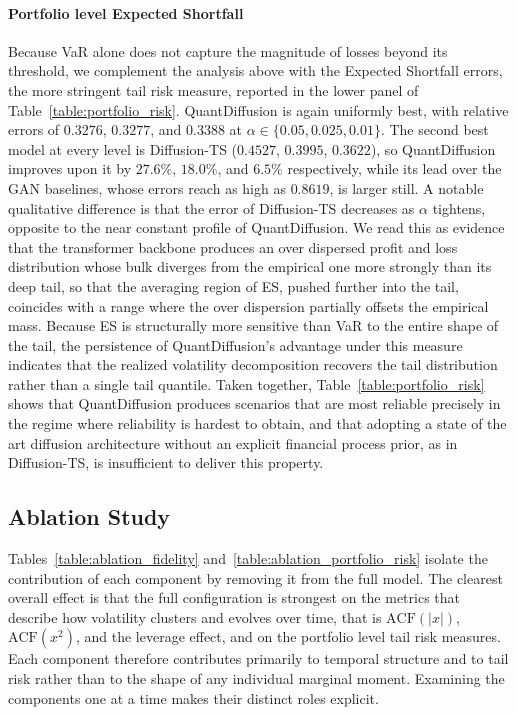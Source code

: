 \documentclass[sigconf,natbib=false]{acmart}
\begin{document}
\paragraph{Portfolio level Expected Shortfall}

Because VaR alone does not capture the magnitude of losses beyond its threshold, we complement the analysis above with the Expected Shortfall errors, the more stringent tail risk measure, reported in the lower panel of Table~\ref{table:portfolio_risk}. QuantDiffusion is again uniformly best, with relative errors of $0.3276$, $0.3277$, and $0.3388$ at $\alpha \in \{0.05, 0.025, 0.01\}$. The second best model at every level is Diffusion-TS ($0.4527$, $0.3995$, $0.3622$), so QuantDiffusion improves upon it by $27.6\%$, $18.0\%$, and $6.5\%$ respectively, while its lead over the GAN baselines, whose errors reach as high as $0.8619$, is larger still. A notable qualitative difference is that the error of Diffusion-TS decreases as $\alpha$ tightens, opposite to the near constant profile of QuantDiffusion. We read this as evidence that the transformer backbone produces an over dispersed profit and loss distribution whose bulk diverges from the empirical one more strongly than its deep tail, so that the averaging region of ES, pushed further into the tail, coincides with a range where the over dispersion partially offsets the empirical mass. Because ES is structurally more sensitive than VaR to the entire shape of the tail, the persistence of QuantDiffusion's advantage under this measure indicates that the realized volatility decomposition recovers the tail distribution rather than a single tail quantile. Taken together, Table~\ref{table:portfolio_risk} shows that QuantDiffusion produces scenarios that are most reliable precisely in the regime where reliability is hardest to obtain, and that adopting a state of the art diffusion architecture without an explicit financial process prior, as in Diffusion-TS, is insufficient to deliver this property.

\subsection{Ablation Study}

Tables~\ref{table:ablation_fidelity} and~\ref{table:ablation_portfolio_risk} isolate the contribution of each component by removing it from the full model. The clearest overall effect is that the full configuration is strongest on the metrics that describe how volatility clusters and evolves over time, that is $\mathrm{ACF}(|x|)$, $\mathrm{ACF}(x^{2})$, and the leverage effect, and on the portfolio level tail risk measures. Each component therefore contributes primarily to temporal structure and to tail risk rather than to the shape of any individual marginal moment. Examining the components one at a time makes their distinct roles explicit.
\end{document}
